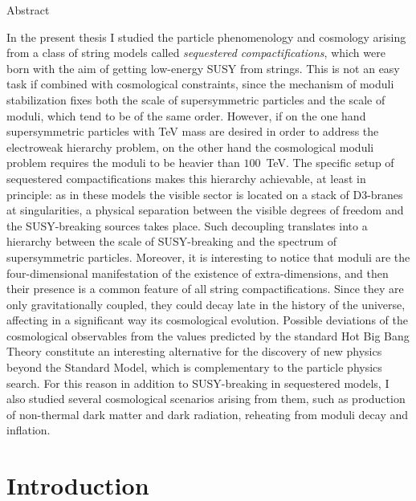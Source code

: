 \documentclass[12pt,a4paper]{book}
\begin{document}
\begin{midpage}
\begin{center}
\huge{Abstract}
\end{center}

In the present thesis I studied the particle phenomenology and cosmology arising from a class of string models called \textit{sequestered compactifications}, which were born with the aim of getting low-energy SUSY from strings. This is not an easy task if combined with cosmological constraints, since the mechanism of moduli stabilization fixes both the scale of supersymmetric particles and the scale of moduli, which tend to be of the same order. However, if on the one hand supersymmetric particles with TeV mass are desired in order to address the electroweak hierarchy problem, on the other hand the cosmological moduli problem requires the moduli to be heavier than $100 \,$ TeV. The specific setup of sequestered compactifications makes this hierarchy achievable, at least in principle: as in these models the visible sector is located on a stack of D3-branes at singularities, a physical separation between the visible degrees of freedom and the SUSY-breaking sources takes place. Such decoupling translates into a hierarchy between the scale of SUSY-breaking and the spectrum of supersymmetric particles. Moreover, it is interesting to notice that moduli are the four-dimensional manifestation of the existence of extra-dimensions, and then their presence is a common feature of all string compactifications. Since they are only gravitationally coupled, they could decay late in the history of the universe, affecting in a significant way its cosmological evolution. Possible deviations of the cosmological observables from the values predicted by the standard Hot Big Bang Theory constitute an interesting alternative for the discovery of new physics beyond the Standard Model, which is complementary to the particle physics search. For this reason in addition to SUSY-breaking in sequestered models, I also studied several cosmological scenarios arising from them, such as production of non-thermal dark matter and dark radiation, reheating from moduli decay and inflation.
\end{midpage}

\tableofcontents

\mainmatter

\part{Introduction}
\end{document}
